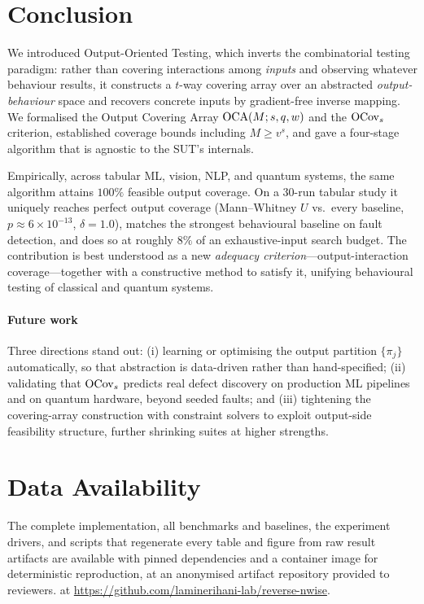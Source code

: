 \section{Conclusion}
\label{sec:conclusion}

We introduced \rnwise{} Output-Oriented Testing, which inverts the combinatorial
testing paradigm: rather than covering interactions among \emph{inputs} and
observing whatever behaviour results, it constructs a $t$-way covering array over
an abstracted \emph{output-behaviour} space and recovers concrete inputs by
gradient-free inverse mapping. We formalised the Output Covering Array
$\mathrm{OCA}(M;s,q,w)$ and the $\mathrm{OCov}_s$ criterion, established coverage bounds including
$M\ge v^{s}$, and gave a four-stage algorithm that is agnostic to the SUT's
internals.

Empirically, across tabular ML, vision, NLP, and quantum systems, the same
algorithm attains $100\%$ feasible output coverage. On a 30-run tabular study it
uniquely reaches perfect output coverage (Mann--Whitney $U$ vs.\ every baseline,
$p\approx6\times10^{-13}$, $\delta=1.0$), matches the strongest behavioural
baseline on fault detection, and does so at roughly $8\%$ of an exhaustive-input
search budget. The contribution is best understood as a new \emph{adequacy
criterion}---output-interaction coverage---together with a constructive method to
satisfy it, unifying behavioural testing of classical and quantum systems.

\paragraph{Future work}
Three directions stand out: (i) learning or optimising the output partition
$\{\pi_j\}$ automatically, so that abstraction is data-driven rather than
hand-specified; (ii) validating that $\mathrm{OCov}_s$ predicts real defect discovery on
production ML pipelines and on quantum hardware, beyond seeded faults; and (iii)
tightening the covering-array construction with constraint solvers to exploit
output-side feasibility structure, further shrinking suites at higher strengths.

\section*{Data Availability}
The complete implementation, all benchmarks and baselines, the experiment drivers,
and scripts that regenerate every table and figure from raw result artifacts are
available with pinned dependencies and a container image for deterministic
reproduction,
\ifanon
at an anonymised artifact repository provided to reviewers.
\else
at \url{https://github.com/laminerihani-lab/reverse-nwise}.
\fi
